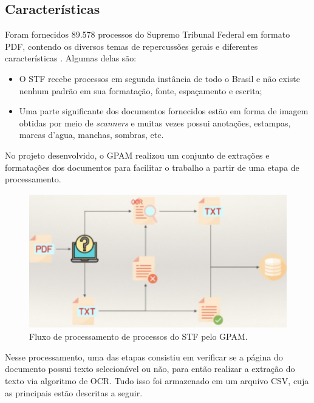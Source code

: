 \subsection{Características}

Foram fornecidos 89.578 processos do Supremo Tribunal Federal em formato PDF, contendo os diversos temas de repercussões gerais e diferentes características \cite{cnn-for-STF}. Algumas delas são:

\begin{itemize}
  \item O STF recebe processos em segunda instância de todo o Brasil e não existe nenhum padrão em sua formatação, fonte, espaçamento e escrita;
  \item Uma parte significante dos documentos fornecidos estão em forma de imagem obtidas por meio de \textit{scanners} e muitas vezes possui anotações, estampas, marcas d'agua, manchas, sombras, etc.
\end{itemize}


No projeto desenvolvido, o GPAM realizou um conjunto de extrações e formatações dos documentos para facilitar o trabalho a partir de uma etapa de processamento.

\begin{figure}[H]
  \includegraphics[width=13cm, center]{figuras/gpan-pipeline.png}
  \caption{Fluxo de processamento de processos do STF pelo GPAM.}
  \label{fig:gpan-pipeline}
\end{figure}

Nesse processamento, uma das etapas consistiu em verificar se a página do documento possui texto selecionável ou não, para então realizar a extração do texto via algoritmo de OCR. Tudo isso foi armazenado em um arquivo CSV, cuja as principais estão descritas a seguir.


